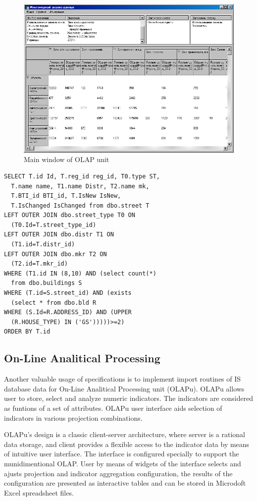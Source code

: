 \documentclass[conference]{IEEEtran}
\begin{document}
\begin{figure}[b]
  \centering
  \includegraphics[width=\linewidth]{MDA-olap.png}
  \caption{Main window of OLAP unit}
  \label{fig:olapu}
\end{figure}


\begin{lstlisting}
SELECT T.id Id, T.reg_id reg_id, T0.type ST,
  T.name name, T1.name Distr, T2.name mk,
  T.BTI_id BTI_id, T.IsNew IsNew,
  T.IsChanged IsChanged from dbo.street T
LEFT OUTER JOIN dbo.street_type T0 ON
  (T0.Id=T.street_type_id)
LEFT OUTER JOIN dbo.distr T1 ON
  (T1.id=T.distr_id)
LEFT OUTER JOIN dbo.mkr T2 ON
  (T2.id=T.mkr_id)
WHERE (T1.id IN (8,10) AND (select count(*)
  from dbo.buildings S
WHERE (T.id=S.street_id) AND (exists
  (select * from dbo.bld R
WHERE (S.Id=R.ADDRESS_ID) AND (UPPER
  (R.HOUSE_TYPE) IN ('GS')))))>=2)
ORDER BY T.id
\end{lstlisting}

\subsection{On-Line Analitical Processing}
\label{sec:olap}

Another valuable usage of specifications is to implement import routines of IS database data for On-Line Analitical Processing unit (OLAPu).  OLAPu allows user to store, select and analyze numeric indicators.  The indicators are considered as funtions of a set of attributes.  OLAPu  user interface aids selection of indicators in various projection combinations.

OLAPu's design is a classic client-server architecture, where server is a rational data storage, and client provides a flexible access to the indicator data by means of intuitive user interface.  The interface is configured specially to support the munidimentional OLAP.  User by means of widgets of the interface selects and ajusts projection and indicator aggregation configuration, the results of the configuration are presented as interactive tables and can be stored in Microdoft Excel spreadsheet files.
\end{document}

